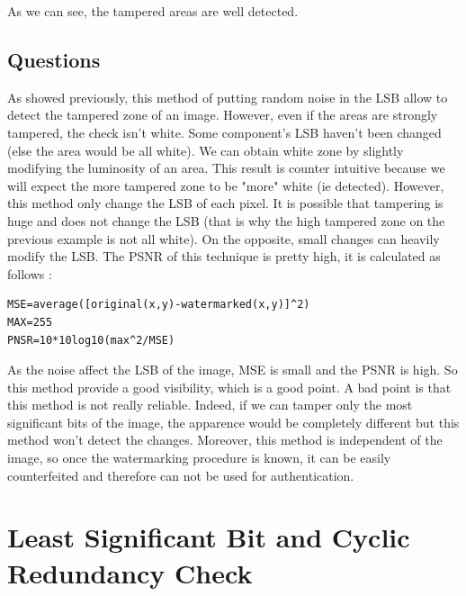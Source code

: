 \documentclass[11pt, oneside]{article}   	%
\begin{document}
			As we can see, the tampered areas are well detected. 
\subsection{Questions}
As showed previously, this method of putting random noise in the LSB allow to detect the tampered zone of an image. However, even if the areas are strongly tampered, the check isn't white. Some component's LSB haven't been changed (else the area would be all white). 
\newline
We can obtain white zone by slightly modifying the luminosity of an area. This result is counter intuitive because we will expect the more tampered zone to be "more" white (ie detected). However, this method only change the LSB of each pixel. It is possible that tampering is huge and does not change the LSB (that is why the high tampered zone on the previous example is not all white). \newline On the opposite, small changes can heavily modify the LSB. \newline
The PSNR of this technique is pretty high, it is calculated as follows :
\begin{lstlisting}
MSE=average([original(x,y)-watermarked(x,y)]^2)
MAX=255
PNSR=10*10log10(max^2/MSE)
\end{lstlisting}
As the noise affect the LSB of the image, MSE is small and the PSNR is high. So this method provide a good visibility, which is a good point.
\newline
A bad point is that this method is not really reliable. Indeed, if we can tamper only the most significant bits of the image, the apparence would be completely different but this method won't detect the changes. Moreover, this method is independent of the image, so once the watermarking procedure is known, it can be easily counterfeited and therefore can not be used for authentication.
\section{Least Significant Bit and Cyclic Redundancy Check}
\end{document}
